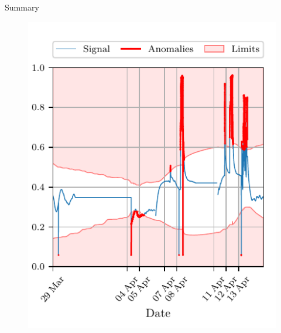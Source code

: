 \documentclass[aspectratio=169]{beamer}
\makeatletter
\def\beamer@writeslidentry@miniframesoff{%
  \expandafter\beamer@ifempty\expandafter{\beamer@framestartpage}{}%
  {%
    \clearpage\beamer@notesactions%
  }
}
\newcommand*{\miniframesoff}{\let\beamer@writeslidentry=\beamer@writeslidentry@miniframesoff}
\makeatother
\begin{document}
\begin{frame}{Summary}
\begin{minipage}{0.38\linewidth}
\begin{figure}[htpb]
\begin{center}
                \includegraphics[width=1\linewidth]{../ilustrate/pc2023/inverter/half_Inverter_Temperature_sliding_thresh.pdf}
            \end{center}
        \end{figure}
    \end{minipage}
    

\end{frame}

\miniframesoff
\section{}
\end{document}
